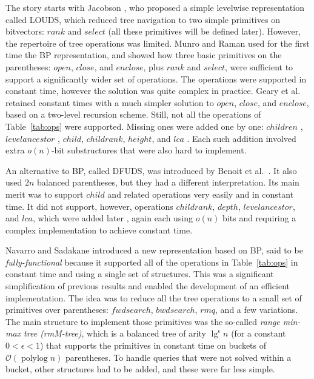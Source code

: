 \documentclass[11pt]{article}
\renewcommand{\log}{\lg}
\newcommand{\0}{\mathit{0}}
\newcommand{\1}{\mathit{1}}
\newcommand{\rank}{\mathit{rank}}
\newcommand{\select}{\mathit{select}}
\newcommand{\depth}{\mathit{depth}}
\newcommand{\height}{\mathit{height}}
\newcommand{\levelanc}{\mathit{levelancestor}}
\newcommand{\children}{\mathit{children}}
\newcommand{\child}{\mathit{child}}
\newcommand{\childrank}{\mathit{childrank}}
\newcommand{\lca}{\mathit{lca}}
\newcommand{\fwdsearch}{\mathit{fwdsearch}}
\newcommand{\bwdsearch}{\mathit{bwdsearch}}
\newcommand{\close}{\mathit{close}}
\newcommand{\open}{\mathit{open}}
\newcommand{\enclose}{\mathit{enclose}}
\newcommand{\rmq}{\mathit{rmq}}
\newcommand{\Oh}[1]{\mathcal{O}\!\left(#1\right)}
\newcommand{\polylog}{\mathop{\mathrm{polylog}}}
\begin{document}
The story starts with Jacobson \cite{Jac89}, 
who proposed a simple levelwise representation called LOUDS, which reduced 
tree navigation to two simple primitives on bitvectors: $\rank$ and 
$\select$ (all these primitives will be defined later). 
However, the repertoire of tree operations was limited. Munro and Raman 
\cite{MR01} used for the first time the BP representation, and showed how 
three basic primitives on the parentheses: $\open$, $\close$, and $\enclose$, 
plus $\rank$ and $\select$, were sufficient to support a significantly wider 
set of operations. The operations were supported in constant time, however
the solution was quite complex in practice. Geary et al.~\cite{GRRR06} retained 
constant times with a much simpler solution to $\open$, $\close$, and 
$\enclose$, based on a two-level recursion scheme. Still, not all the
operations of Table~\ref{tab:ops} were supported. Missing ones were
added one by one: $\children$ \cite{CLL05}, $\levelanc$ \cite{MRRR12}, 
$\child$, $\childrank$, $\height$, and $\lca$ \cite{LY08}. Each such addition
involved extra $o(n)$-bit substructures that were also hard to 
implement.

An alternative to BP, called DFUDS, was introduced by Benoit et 
al.~\cite{BDMRRR05}. It also used $2n$ balanced parentheses, but they had a
different interpretation. Its main merit was to support $\child$ and related 
operations very easily and in constant time. It did not support, however, 
operations $\childrank$, $\depth$, $\levelanc$, and $\lca$, which were added 
later \cite{GRR06,JSS12}, again each using $o(n)$ bits and requiring a complex
implementation to achieve constant time.

Navarro and Sadakane \cite{NS14} introduced a new representation based on BP,
said to be {\em fully-functional} because it supported all of the operations
in Table~\ref{tab:ops} in constant time and using a single set of structures.
This was a significant simplification of previous results and enabled the
development of an efficient implementation. The idea was to reduce all the
tree operations to a small set of primitives over parentheses:
$\fwdsearch$, $\bwdsearch$, $\rmq$, and a few variations. The main structure
to implement those primitives was the so-called {\em range min-max tree
(rmM-tree)}, which is a balanced tree of arity $\log^\epsilon n$ (for a constant
$0<\epsilon<1$) that supports the primitives in constant time on buckets of 
$\Oh{\polylog n}$ parentheses. To handle queries that were not solved 
within a bucket, other structures had to be added, and these were far less simple.
\end{document}
